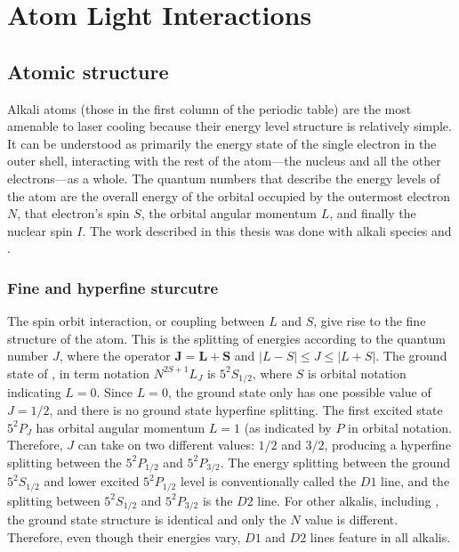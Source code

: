 \renewcommand{\thechapter}{3}

\chapter{Atom Light Interactions}

\section{Atomic structure}

Alkali atoms (those in the first column of the periodic table) are the most amenable to laser cooling because their energy level structure is relatively simple. It can be understood as primarily the energy state of the single electron in the outer shell, interacting with the rest of the atom---the nucleus and all the other electrons---as a whole. The quantum numbers that describe the energy levels of the atom are the overall energy of the orbital occupied by the outermost electron $N$, that electron's spin $S$, the orbital angular momentum $L$, and finally the nuclear spin $I$. The work described in this thesis was done with alkali species \Rb{} and \K{}.

\subsection{Fine and hyperfine sturcutre}

The spin orbit interaction, or coupling between $L$ and $S$, give rise to the fine structure of the atom. This is the splitting of energies according to the quantum number $J$, where the operator $\textbf{J}=\textbf{L}+\textbf{S}$ and $|L - S| \leq J \leq |L + S|$.  The ground state of \Rb{}, in term notation $N^{2S+1}L_J$ is $5^2S_{1/2}$, where $S$ is orbital notation indicating $L=0$. Since $L=0$, the ground state only has one possible value of $J=1/2$, and there is no ground state hyperfine splitting. The first excited state $5^2P_J$ has orbital angular momentum $L=1$ (as indicated by $P$ in orbital notation. Therefore, $J$ can take on two different values: $1/2$ and $3/2$, producing a hyperfine splitting between the $5^2P_{1/2}$ and $5^2P_{3/2}$. The energy splitting between the ground $5^2S_{1/2}$ and lower excited $5^2P_{1/2}$ level is conventionally called the $D1$ line, and the splitting between $5^2S_{1/2}$ and  $5^2P_{3/2}$ is the $D2$ line. For other alkalis, including \K{}, the ground state structure is identical and only the $N$ value is different. Therefore, even though their energies vary, $D1$ and $D2$ lines feature in all alkalis.

